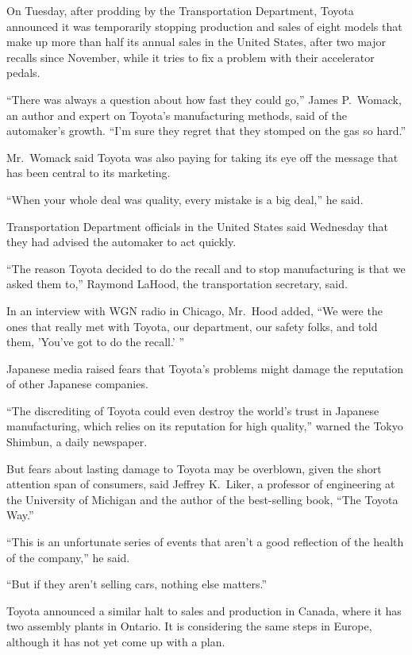 ﻿\documentclass[12pt]{article}
\begin{document}
On Tuesday, after prodding by the Transportation Department, Toyota announced it was temporarily
stopping production and sales of eight models that make up more than half its annual sales in the
United States, after two major recalls since November, while it tries to fix a problem with their
accelerator pedals.

``There was always a question about how fast they could go,'' James P.~Womack, an author and expert
on Toyota's manufacturing methods, said of the automaker's growth. ``I'm sure they regret that they
stomped on the gas so hard.''

Mr.~Womack said Toyota was also paying for taking its eye off the message that has been central to
its marketing.

``When your whole deal was quality, every mistake is a big deal,'' he said.

Transportation Department officials in the United States said Wednesday that they had advised the
automaker to act quickly.

``The reason Toyota decided to do the recall and to stop manufacturing is that we asked them to,''
Raymond LaHood, the transportation secretary, said.

In an interview with WGN radio in Chicago, Mr.~Hood added, ``We were the ones that really met with
Toyota, our department, our safety folks, and told them, 'You've got to do the recall.' ''

Japanese media raised fears that Toyota's problems might damage the reputation of other Japanese
companies.

``The discrediting of Toyota could even destroy the world's trust in Japanese manufacturing, which
relies on its reputation for high quality,'' warned the Tokyo Shimbun, a daily newspaper.

But fears about lasting damage to Toyota may be overblown, given the short attention span of
consumers, said Jeffrey K.~Liker, a professor of engineering at the University of Michigan and the
author of the best-selling book, ``The Toyota Way.''

``This is an unfortunate series of events that aren't a good reflection of the health of the
company,'' he said.

``But if they aren't selling cars, nothing else matters.''

Toyota announced a similar halt to sales and production in Canada, where it has two assembly plants
in Ontario. It is considering the same steps in Europe, although it has not yet come up with a plan.
\end{document}

